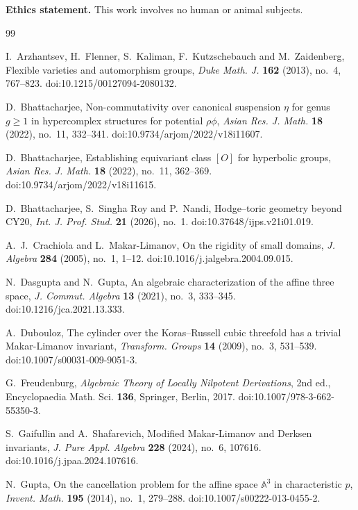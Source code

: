 \documentclass[11pt]{amsart}
\theoremstyle{definition}
\begin{document}
\smallskip\noindent\textbf{Ethics statement.} This work involves no human or animal subjects.

\begin{thebibliography}{99}

 I.~Arzhantsev, H.~Flenner, S.~Kaliman, F.~Kutzschebauch and M.~Zaidenberg, Flexible varieties and automorphism groups, \emph{Duke Math. J.} \textbf{162} (2013), no.~4, 767--823. doi:10.1215/00127094-2080132.

 D.~Bhattacharjee, Non-commutativity over canonical suspension $\eta$ for genus $g\ge1$ in hypercomplex structures for potential $\rho\phi$, \emph{Asian Res. J. Math.} \textbf{18} (2022), no.~11, 332--341. doi:10.9734/arjom/2022/v18i11607.

 D.~Bhattacharjee, Establishing equivariant class $[O]$ for hyperbolic groups, \emph{Asian Res. J. Math.} \textbf{18} (2022), no.~11, 362--369. doi:10.9734/arjom/2022/v18i11615.

 D.~Bhattacharjee, S.~Singha Roy and P.~Nandi, Hodge--toric geometry beyond CY20, \emph{Int. J. Prof. Stud.} \textbf{21} (2026), no.~1. doi:10.37648/ijps.v21i01.019.

 A.~J.~Crachiola and L.~Makar-Limanov, On the rigidity of small domains, \emph{J. Algebra} \textbf{284} (2005), no.~1, 1--12. doi:10.1016/j.jalgebra.2004.09.015.

 N.~Dasgupta and N.~Gupta, An algebraic characterization of the affine three space, \emph{J. Commut. Algebra} \textbf{13} (2021), no.~3, 333--345. doi:10.1216/jca.2021.13.333.

 A.~Dubouloz, The cylinder over the Koras--Russell cubic threefold has a trivial Makar-Limanov invariant, \emph{Transform. Groups} \textbf{14} (2009), no.~3, 531--539. doi:10.1007/s00031-009-9051-3.

 G.~Freudenburg, \emph{Algebraic Theory of Locally Nilpotent Derivations}, 2nd ed., Encyclopaedia Math. Sci. \textbf{136}, Springer, Berlin, 2017. doi:10.1007/978-3-662-55350-3.

 S.~Gaifullin and A.~Shafarevich, Modified Makar-Limanov and Derksen invariants, \emph{J. Pure Appl. Algebra} \textbf{228} (2024), no.~6, 107616. doi:10.1016/j.jpaa.2024.107616.

 N.~Gupta, On the cancellation problem for the affine space $\mathbb A^3$ in characteristic $p$, \emph{Invent. Math.} \textbf{195} (2014), no.~1, 279--288. doi:10.1007/s00222-013-0455-2.


\end{thebibliography}
\end{document}
